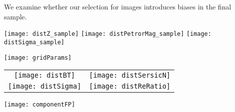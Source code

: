 \documentclass[iop]{emulateapj}
\newcommand{\Sersic}{S\'ersic}
\begin{document}
We examine whether our selection for images introduces biases
in the final sample.

\begin{figure*}[]
    \begin{center}
        \texttt{[image: distZ\_sample]}
        \texttt{[image: distPetrorMag\_sample]}
        \texttt{[image: distSigma\_sample]}
    \end{center}
    \caption{Distribution of redshift, Petrosian r magnitude, and velocity
        dispersion before and after excluding bad images.
        Bottom panels show the fraction of excluded galaxies in each bin.}
    \label{fig:SampleImageBias}
\end{figure*}

\begin{figure*}[]
    \begin{center}
        \texttt{[image: gridParams]}
    \end{center}
    \caption{Correlation between key parameters of deVExp model. Red points
        highlight double component galaxies.}
    \label{fig:CornerPlot}
\end{figure*}

\begin{figure*}[]
    \begin{tabular}{cc}
        \texttt{[image: distBT]} &
        \texttt{[image: distSersicN]}\\
        \texttt{[image: distSigma]} &
        \texttt{[image: distReRatio]}
    \end{tabular}
    \caption{Distribution of $B/T$, \Sersic index, $\sigma$ and
        $R_{e,1}/R_{e,4}$ for single and double component galaxies.}
    \label{fig:DoubleCompParams}
\end{figure*}

\begin{figure*}[]
    \begin{center}
        \texttt{[image: componentFP]}
    \end{center}
    \caption{The Fundamental Plane relation for deV (red) and Exp (blue)
        component of deVExp model. The two figures are identical except
        highlighted component. Larger symbols are for double component
        galaxies.}
    \label{fig:ComponentFP}
\end{figure*}
\end{document}

